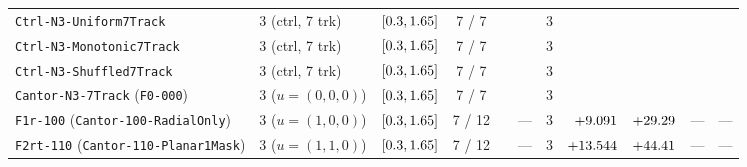 \begin{table}[!htbp]
{\begin{tabular}{llccccrrrrr}
\texttt{Ctrl-N3-Uniform7Track} & 3 (ctrl, 7 trk) & $[0.3{}, 1.65{}]$ & 7 / 7 & \NatureCtrlNthreeUniformseventrackFullToothPlanformAreaUmtwo{} & \NatureCtrlNthreeUniformseventrackFullToothPlanformPerimeterUm{} & 3 & \NatureCtrlNthreeUniformseventrackFRepPn{} & \NatureCtrlNthreeUniformseventrackFRepPnPerToothAreaUmtwo{} & \NatureCtrlNthreeUniformseventrackFRepPnPerToothPerimeterUm{} & \NatureCtrlNthreeUniformseventrackFAttPn{} \\
\texttt{Ctrl-N3-Monotonic7Track} & 3 (ctrl, 7 trk) & $[0.3{}, 1.65{}]$ & 7 / 7 & \NatureCtrlNthreeMonotonicseventrackFullToothPlanformAreaUmtwo{} & \NatureCtrlNthreeMonotonicseventrackFullToothPlanformPerimeterUm{} & 3 & \NatureCtrlNthreeMonotonicseventrackFRepPn{} & \NatureCtrlNthreeMonotonicseventrackFRepPnPerToothAreaUmtwo{} & \NatureCtrlNthreeMonotonicseventrackFRepPnPerToothPerimeterUm{} & \NatureCtrlNthreeMonotonicseventrackFAttPn{} \\
\texttt{Ctrl-N3-Shuffled7Track} & 3 (ctrl, 7 trk) & $[0.3{}, 1.65{}]$ & 7 / 7 & \NatureCtrlNthreeShuffledseventrackFullToothPlanformAreaUmtwo{} & \NatureCtrlNthreeShuffledseventrackFullToothPlanformPerimeterUm{} & 3 & \NatureCtrlNthreeShuffledseventrackFRepPn{} & \NatureCtrlNthreeShuffledseventrackFRepPnPerToothAreaUmtwo{} & \NatureCtrlNthreeShuffledseventrackFRepPnPerToothPerimeterUm{} & \NatureCtrlNthreeShuffledseventrackFAttPn{} \\
\texttt{Cantor-N3-7Track} (\texttt{F0-000}) & 3 ($u=(0,0,0)$) & $[0.3{}, 1.65{}]$ & 7 / 7 & \NatureFractalNthreeCantorseventrackFullToothPlanformAreaUmtwo{} & \NatureFractalNthreeCantorseventrackFullToothPlanformPerimeterUm{} & 3 & \NatureFractalNthreeCantorseventrackFRepPn{} & \NatureFractalNthreeCantorseventrackFRepPnPerToothAreaUmtwo{} & \NatureFractalNthreeCantorseventrackFRepPnPerToothPerimeterUm{} & \NatureFractalNthreeCantorseventrackFAttPn{} \\
\texttt{F1r-100} (\texttt{Cantor-100-RadialOnly}) & 3 ($u=(1,0,0)$) & $[0.3{}, 1.65{}]$ & 7 / 12 & \roundfour{\NthreeUnithreedFonezerozeroRAreaUmtwo} & --- & 3 & $+\roundfour{\NthreeUnithreedFonezerozeroRFzPn}$ & $+\roundtwo{\NthreeUnithreedFonezerozeroRFa}$ & --- & --- \\
\texttt{F2rt-110} (\texttt{Cantor-110-Planar1Mask}) & 3 ($u=(1,1,0)$) & $[0.3{}, 1.65{}]$ & 7 / 12 & \roundfour{\NthreeUnithreedFoneonezeroRthetaPlanarAreaUmtwo} & --- & 3 & $+\roundfour{\NthreeUnithreedFoneonezeroRthetaPlanarFzPn}$ & $+\roundtwo{\NthreeUnithreedFoneonezeroRthetaPlanarFa}$ & --- & --- \\

\end{tabular}}
\end{table}
